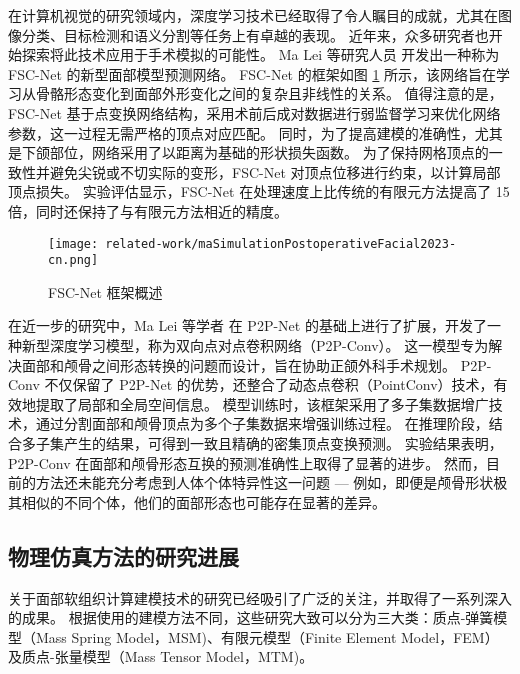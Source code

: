 在计算机视觉的研究领域内，深度学习技术已经取得了令人瞩目的成就，尤其在图像分类、目标检测和语义分割等任务上有卓越的表现。
近年来，众多研究者也开始探索将此技术应用于手术模拟的可能性。
Ma Lei 等研究人员 \cite{maSimulationPostoperativeFacial2023} 开发出一种称为 FSC-Net 的新型面部模型预测网络。
FSC-Net 的框架如图 \ref{fig:maBidirectionalPredictionFacial2023} 所示，该网络旨在学习从骨骼形态变化到面部外形变化之间的复杂且非线性的关系。
值得注意的是，FSC-Net 基于点变换网络结构，采用术前后成对数据进行弱监督学习来优化网络参数，这一过程无需严格的顶点对应匹配。
同时，为了提高建模的准确性，尤其是下颌部位，网络采用了以距离为基础的形状损失函数。
为了保持网格顶点的一致性并避免尖锐或不切实际的变形，FSC-Net 对顶点位移进行约束，以计算局部顶点损失。
实验评估显示，FSC-Net 在处理速度上比传统的有限元方法提高了 15 倍，同时还保持了与有限元方法相近的精度。

\begin{figure}
  \centering
  \texttt{[image: related-work/maSimulationPostoperativeFacial2023-cn.png]}
  \caption{
    FSC-Net 框架概述 \cite{maBidirectionalPredictionFacial2023}
  }
  \label{fig:maBidirectionalPredictionFacial2023}
\end{figure}

在近一步的研究中，Ma Lei 等学者 \cite{maBidirectionalPredictionFacial2023} 在 P2P-Net \cite{yinP2PNETBidirectionalPoint2018} 的基础上进行了扩展，开发了一种新型深度学习模型，称为双向点对点卷积网络（P2P-Conv）。
这一模型专为解决面部和颅骨之间形态转换的问题而设计，旨在协助正颌外科手术规划。
P2P-Conv 不仅保留了 P2P-Net 的优势，还整合了动态点卷积（PointConv）技术，有效地提取了局部和全局空间信息。
模型训练时，该框架采用了多子集数据增广技术，通过分割面部和颅骨顶点为多个子集数据来增强训练过程。
在推理阶段，结合多子集产生的结果，可得到一致且精确的密集顶点变换预测。
实验结果表明，P2P-Conv 在面部和颅骨形态互换的预测准确性上取得了显著的进步。
然而，目前的方法还未能充分考虑到人体个体特异性这一问题 --- 例如，即便是颅骨形状极其相似的不同个体，他们的面部形态也可能存在显著的差异。

\subsection{物理仿真方法的研究进展}

关于面部软组织计算建模技术的研究已经吸引了广泛的关注，并取得了一系列深入的成果。
根据使用的建模方法不同，这些研究大致可以分为三大类：质点-弹簧模型（Mass Spring Model，MSM)、有限元模型（Finite Element Model，FEM）及质点-张量模型（Mass Tensor Model，MTM)。

